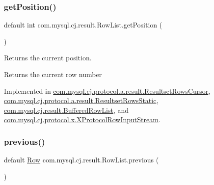 \mbox{\label{interfacecom_1_1mysql_1_1cj_1_1result_1_1_row_list_a403554a1f4945bd623ed3b7489674a2e}} 
\subsubsection{\texorpdfstring{get\+Position()}{getPosition()}}
{\footnotesize\ttfamily default int com.\+mysql.\+cj.\+result.\+Row\+List.\+get\+Position (\begin{DoxyParamCaption}{ }\end{DoxyParamCaption})}

Returns the current position.

\begin{DoxyReturn}{Returns}
the current row number 
\end{DoxyReturn}


Implemented in \mbox{\hyperlink{classcom_1_1mysql_1_1cj_1_1protocol_1_1a_1_1result_1_1_resultset_rows_cursor_ab1ee40d0ad7227af904036a217b226e4}{com.\+mysql.\+cj.\+protocol.\+a.\+result.\+Resultset\+Rows\+Cursor}}, \mbox{\hyperlink{classcom_1_1mysql_1_1cj_1_1protocol_1_1a_1_1result_1_1_resultset_rows_static_a3177c1c1350ee04c5d9ab5130e40e97f}{com.\+mysql.\+cj.\+protocol.\+a.\+result.\+Resultset\+Rows\+Static}}, \mbox{\hyperlink{classcom_1_1mysql_1_1cj_1_1result_1_1_buffered_row_list_a6d18ed3e3cf3ebced974d1cd7d8ca9ec}{com.\+mysql.\+cj.\+result.\+Buffered\+Row\+List}}, and \mbox{\hyperlink{classcom_1_1mysql_1_1cj_1_1protocol_1_1x_1_1_x_protocol_row_input_stream_ae168f4e9360c0d78dcb34cd3e3842d7c}{com.\+mysql.\+cj.\+protocol.\+x.\+X\+Protocol\+Row\+Input\+Stream}}.

\mbox{\label{interfacecom_1_1mysql_1_1cj_1_1result_1_1_row_list_a8fcbee0be0e6e13ee3862c46ec7e8e39}} 
\subsubsection{\texorpdfstring{previous()}{previous()}}
{\footnotesize\ttfamily default \mbox{\hyperlink{interfacecom_1_1mysql_1_1cj_1_1result_1_1_row}{Row}} com.\+mysql.\+cj.\+result.\+Row\+List.\+previous (\begin{DoxyParamCaption}{ }\end{DoxyParamCaption})}

